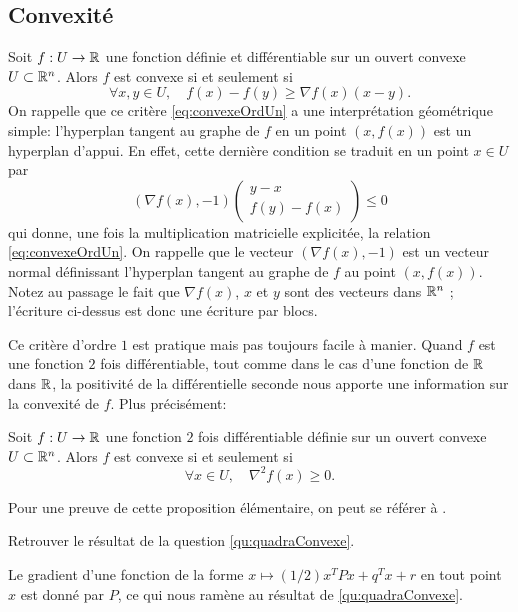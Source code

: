 \documentclass[11pt, a4paper]{article}
\begin{document}
\subsection{Convexité}

Soit $f : U \to \mathbb{R}$ une fonction définie et différentiable sur un ouvert convexe
$U \subset \mathbb{R}^n$. Alors $f$ est convexe si et seulement si
\begin{equation}
  \label{eq:convexeOrdUn}
  \forall x, y \in U, \quad f(x) - f(y) \geq \nabla{f}(x)(x-y).
\end{equation}
On rappelle que ce critère \eqref{eq:convexeOrdUn} a une
interprétation géométrique simple: l'hyperplan tangent au graphe de
$f$ en un point $(x, f(x))$ est un hyperplan d'appui. En effet, cette
dernière condition se traduit en un point $x \in U$ par
\[
(\nabla{f}(x), -1)  \begin{pmatrix}  y - x \\ f(y) - f(x) \end{pmatrix} \leq 0
\]
qui donne, une fois la multiplication matricielle explicitée, la
relation \eqref{eq:convexeOrdUn}. On rappelle que le vecteur
$(\nabla{f}(x), -1)$ est un vecteur normal définissant l'hyperplan
tangent au graphe de $f$ au point $(x, f(x))$. Notez au passage le fait
que $\nabla{f}(x)$, $x$ et $y$ sont des vecteurs dans $\mathbb{R}^n$ ;
l'écriture ci-dessus est donc une écriture par blocs.

Ce critère d'ordre $1$ est pratique mais pas toujours facile à
manier. Quand $f$ est une fonction $2$ fois différentiable, tout comme
dans le cas d'une fonction de $\mathbb{R}$ dans $\mathbb{R}$, la positivité de la
différentielle seconde nous apporte une information sur la convexité
de $f$. Plus précisément:
\begin{prop}
  Soit $f : U \to \mathbb{R}$ une fonction $2$ fois différentiable définie sur
  un ouvert convexe $U \subset \mathbb{R}^n$. Alors $f$ est convexe si et
  seulement si
  \begin{equation}
    \label{eq:convexeOrdDeux}
    \forall x \in U, \quad \nabla^2{f}(x) \geq 0.
  \end{equation}
\end{prop}
Pour une preuve de cette proposition élémentaire, on peut se référer à
\cite[Exercice 108]{rouviere2009petit}. 

\begin{question}
  Retrouver le résultat de la question \eqref{qu:quadraConvexe}.
\end{question}
\begin{solution}
  Le gradient d'une fonction de la forme
  $x \mapsto (1/2)x^TPx + q^Tx + r$ en tout point $x$ est donné par
  $P$, ce qui nous ramène au résultat de \eqref{qu:quadraConvexe}.
\end{solution}
\end{document}

